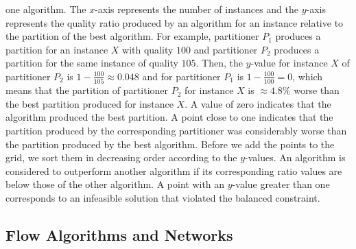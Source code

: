 one algorithm. The $x$-axis represents the number of instances and the $y$-axis represents the quality ratio
produced by an algorithm for an instance relative to the partition of the best algorithm. 
For example, partitioner $P_1$ produces a partition for an instance $X$ with
quality $100$ and partitioner $P_2$ produces a partition for the same instance of quality $105$.
Then, the $y$-value for instance $X$ of partitioner $P_2$ is $1 - \frac{100}{105} \approx 0.048$ and
for partitioner $P_1$ is $1 - \frac{100}{100} = 0$, which means that the partition of partitioner $P_2$
for instance $X$ is $\approx 4.8\%$ worse than the best partition produced for instance $X$.
 A value of zero indicates that the algorithm
produced the best partition. A point close to one indicates that the partition produced by the 
corresponding partitioner was considerably worse than the partition produced by the best
algorithm. Before we add the points to the grid, we sort them in decreasing order 
according to the $y$-values. An algorithm is considered to outperform another algorithm if its 
corresponding ratio values are below those of the other algorithm. A point with an $y$-value
greater than one corresponds to an infeasible solution that violated the balanced constraint.

\subsection{Flow Algorithms and Networks}
\label{sec:exp_flow_network}

